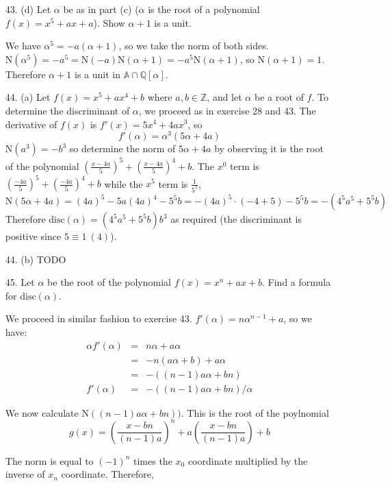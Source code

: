 \documentclass{article}
\newcommand{\Q}[0]{\mathbb{Q}}
\newcommand{\Z}[0]{\mathbb{Z}}
\newcommand{\norm}[1]{\text{N}(#1)}
\newcommand{\disc}[1]{\text{disc}(#1)}
\begin{document}
\begin{enumerate}
\item[43. (d)] Let $\alpha$ be as in part (c) ($\alpha$ is the root of a polynomial $f(x) = x^5 + ax + a$).  Show $\alpha + 1$ is a unit.

We have $\alpha^5 = -a(\alpha + 1)$, so we take the norm of both sides.  $\norm{\alpha^5} = -a^5 = \norm{-a} \norm{\alpha + 1} = -a^5 \norm{\alpha+1}$, so $\norm{\alpha + 1} = 1$.  Therefore $\alpha + 1$ is a unit in $\mathbb{A} \cap \Q[\alpha]$.

\item[44. (a)] Let $f(x) = x^5 + ax^4 + b$ where $a, b \in \Z$, and let $\alpha$ be a root of $f$.  To determine the discriminant of $\alpha$, we proceed as in exercise 28 and 43.  The derivative of $f(x)$ is $f'(x) = 5x^4 + 4ax^3$, so  \[ f'(\alpha) = \alpha^3(5\alpha + 4a) \]  $\norm{a^3} = -b^3$ so determine the norm of $5\alpha + 4a$ by observing it is the root of the polynomial $(\frac{x - 4a}{5})^5 + (\frac{x - 4a}{5})^4 + b$.  The $x^0$ term is $(\frac{-4a}{5})^5 + (\frac{-4a}{5})^4 + b$ while the $x^5$ term is $\frac{1}{5^5}$, \[ \norm{5\alpha + 4a} = (4a)^5 - 5a (4a)^4 - 5^5 b = -(4a)^5 \cdot (-4 + 5) - 5^5 b = -(4^5 a^5 + 5^5 b) \]  Therefore $\disc{\alpha} = (4^5 a^5 + 5^5 b)b^3$ as required (the discriminant is positive since $5 \equiv 1\ (4)$).

\item[44. (b)] TODO

\item[45.] Let $\alpha$ be the root of the polynomial $f(x) = x^n + ax + b$.  Find a formula for $\disc{\alpha}$.

We proceed in similar fashion to exercise 43. $f'(\alpha) = n\alpha^{n-1} + a$, so we have:
\begin{eqnarray*}
    \alpha f'(\alpha) &=& n\alpha + a\alpha \\
                      &=& -n(a \alpha + b) + a\alpha \\
                      &=& -((n - 1)a \alpha + bn) \\
    f'(\alpha) &=& -((n - 1)a \alpha + bn) / \alpha
\end{eqnarray*}

We now calculate $\norm{(n - 1)a \alpha + bn)}$.  This is the root of the poylnomial
\[ g(x) = \left(\frac{x - bn}{(n-1)a}\right)^n + a \left(\frac{x - bn}{(n-1)a}\right) + b\]

The norm is equal to $(-1)^n$ times the $x_0$ coordinate multiplied by the inverse of $x_n$ coordinate.  Therefore,


\end{enumerate}
\end{document}
